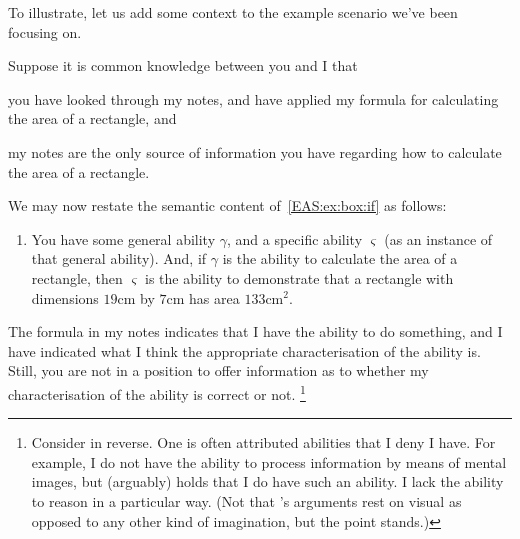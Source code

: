\begin{note}
  To illustrate, let us add some context to the example scenario we've been focusing on.

  Suppose it is common knowledge between you and I that
  \begin{enumerate*}
  \item you have looked through my notes, and have applied my formula for calculating the area of a rectangle, and
  \item my notes are the only source of information you have regarding how to calculate the area of a rectangle.
  \end{enumerate*}
  We may now restate the semantic content of~\ref{EAS:ex:box:if} as follows:
  \begin{enumerate}[label=\emph{A}\arabic*., ref=(\emph{A}\arabic*), resume*=EAS_counter]
  \item\label{EAS:ex:box:inf:R} You have some general ability \(\gamma\), and a specific ability \(\varsigma\) (as an instance of that general ability).
    And, if \(\gamma\) is the ability to calculate the area of a rectangle, then \(\varsigma\) is the ability to demonstrate that a rectangle with dimensions \(19\text{cm}\) by \(7\text{cm}\) has area \(133\text{cm}^{2}\).
  \end{enumerate}
  The formula in my notes indicates that I have the ability to do something, and I have indicated what I think the appropriate characterisation of the ability is.
  Still, you are not in a position to offer information as to whether my characterisation of the ability is correct or not.\nolinebreak
  \footnote{
    Consider in reverse.
    One is often attributed abilities that I deny I have.
    For example, I do not have the ability to process information by means of mental images, but \citeauthor{Hume:2011aa} (arguably) holds that I do have such an ability.
    I lack the ability to reason in a particular way.
    (Not that \citeauthor{Hume:2011aa}'s arguments rest on visual as opposed to any other kind of imagination, but the point stands.)

}
\end{note}
